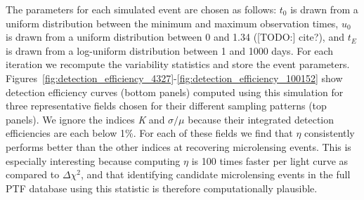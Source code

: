 \documentclass[12pt,preprint]{aastex}
\newcommand{\apwsim}{\raisebox{0.2ex}{\scriptsize$\sim$\normalsize}}
\begin{document}
The parameters for each simulated event are chosen as follows: $t_0$ is drawn from a uniform distribution between the minimum and maximum observation times, $u_0$ is drawn from a uniform distribution between 0 and 1.34 ([TODO:] cite?), and $t_E$ is drawn from a log-uniform distribution between 1 and 1000 days. For each iteration we recompute the variability statistics and store the event parameters. Figures~\ref{fig:detection_efficiency_4327}-\ref{fig:detection_efficiency_100152} show detection efficiency curves (bottom panels) computed using this simulation for three representative fields chosen for their different sampling patterns (top panels). We ignore the indices \textit{K} and $\sigma/\mu$ because their integrated detection efficiencies are each below 1\%. For each of these fields we find that $\eta$ consistently performs better than the other indices at recovering microlensing events. This is especially interesting because computing $\eta$ is \apwsim100 times faster per light curve as compared to $\Delta\chi^2$, and that identifying candidate microlensing events in the full PTF database using this statistic is therefore computationally plausible.


\end{document}
